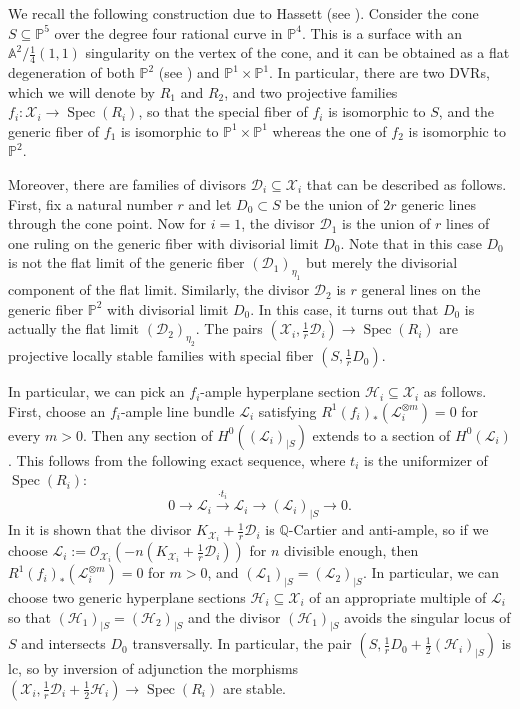 \documentclass[11pt]{amsart}
\theoremstyle{definition}
\theoremstyle{remark}
\newcommand{\calO}{\mathcal O}
\newcommand{\calH}{\mathcal H}
\newcommand{\calL}{\mathcal L}
\newcommand{\calX}{\mathcal X}
\newcommand{\calD}{\mathcal D}
\newcommand{\Spec}{\operatorname{Spec}}
\begin{document}
	We recall the following construction due to Hassett (see \cite[Example 2.41 and 1.42]{kollarmodulibook}). Consider the cone $S \subseteq \mathbb{P}^5$ over the
	degree four rational curve in $\mathbb{P}^4$. This is a surface with an $\mathbb{A}^2/\frac{1}{4}(1,1)$
	singularity on the vertex of the cone, and it can be obtained as a flat degeneration of both $\mathbb{P}^2$ (see \cite[Example 1.42]{kollarmodulibook}) and $\mathbb{P}^1 \times \mathbb{P}^1$. In particular, there are two DVRs, which we will denote by $R_1$ and $R_2$, and two projective families $f_i:\calX_i\to \Spec(R_i)$, so that the special fiber of $f_i$ is isomorphic to $S$, and the generic fiber of $f_1$ is
	isomorphic to $\mathbb{P}^1 \times \mathbb{P}^1$
	whereas the one of $f_2$ is isomorphic to $\mathbb{P}^2$. 
	
	Moreover, there are families of divisors $\calD_i \subseteq \calX_i$
	that can be described as follows. First, fix a natural number $r$ and let $D_0 \subset S$ be the union of $2r$ generic lines through the cone point. Now for $i=1$, the divisor $\calD_1$
	is the union of $r$ lines of one ruling on the generic fiber with divisorial limit $D_0$. Note that in this case $D_0$ is not the flat limit of the generic fiber $(\calD_1)_{\eta_1}$ but merely the divisorial component of the flat limit. Similarly, the divisor $\calD_2$ is $r$ general lines on the generic fiber $\mathbb{P}^2$ with divisorial limit $D_0$. In this case, it turns out that $D_0$ is actually the flat limit $(\calD_2)_{\eta_2}$. The pairs $(\calX_i,\frac{1}{r}\calD_i) \to \Spec(R_i)$ are projective locally stable families with special fiber $(S, \frac{1}{r}D_0)$.
	
	In particular, we can pick an $f_i$-ample hyperplane section $\calH_i\subseteq \calX_i$ as follows. First, choose an $f_i$-ample line bundle $\calL_i$ satisfying $R^1(f_i)_*(\calL_i^{\otimes m})=0$ for every $m>0$.
	Then any section of $H^0((\calL_i)_{|S})$ extends to a section of $H^0(\calL_i)$. This follows
	from the following exact sequence, where $t_i$ is the uniformizer of $\Spec(R_i)$:
	$$0 \to \calL_i \xrightarrow{\cdot t_i} \calL_i \to (\calL_i)_{|S} \to 0.$$
	In \cite[Example 2.41]{kollarmodulibook} it is shown that the divisor $K_{\calX_i}+\frac{1}{r}\calD_i$ is $\mathbb{Q}$-Cartier and anti-ample, so if we choose
	$\calL_i:=\calO_{\calX_i}(-n(K_{\calX_i}+\frac{1}{r}\calD_i))$ for $n$ divisible enough, then $R^1(f_i)_*(\calL_i^{\otimes m})=0$ for $m>0$, and $(\calL_1)_{|S}=(\calL_2)_{|S}$. In particular, we can choose two generic hyperplane sections $\calH_i \subseteq \calX_i$ of an appropriate multiple of $\calL_i$ so that
	$(\calH_1)_{|S}=(\calH_2)_{|S}$ and the divisor $(\calH_1)_{|S}$ avoids the singular locus of $S$ and intersects $D_0$ transversally. In particular, the pair $(S,\frac{1}{r}D_0+ \frac{1}{2}(\calH_i)_{|S})$ is lc, so by inversion of adjunction the morphisms $(\calX_i,\frac{1}{r}\calD_i+\frac{1}{2}\calH_i)\to \Spec(R_i)$ are stable. 
	
\end{document}
